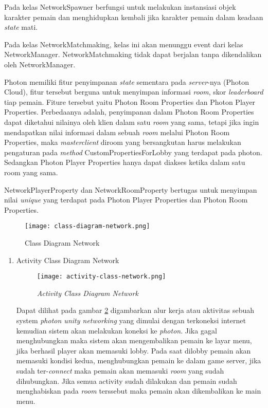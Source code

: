 Pada kelas NetworkSpawner berfungsi untuk melakukan instansiasi objek karakter pemain dan menghidupkan kembali jika karakter pemain dalam keadaan \textit{state} mati.

Pada kelas NetworkMatchmaking, kelas ini akan menunggu event dari kelas NetworkManager. NetworkMatchmaking tidak dapat berjalan tanpa dikendalikan oleh NetworkManager.

Photon memiliki fitur penyimpanan \textit{state} sementara pada \textit{server}-nya (Photon Cloud), fitur tersebut berguna untuk menyimpan informasi \textit{room}, skor \textit{leaderboard} tiap pemain.
Fiture tersebut yaitu Photon Room Properties dan Photon Player Properties.
Perbedaanya adalah, penyimpanan dalam Photon Room Properties dapat diketahui nilainya oleh klien dalam satu \textit{room} yang sama, tetapi jika ingin mendapatkan nilai informasi dalam sebuah \textit{room} melalui Photon Room Properties, maka \textit{masterclient} diroom yang bersangkutan harus melakukan pengaturan pada \textit{method} CustomPropertiesForLobby yang terdapat pada photon.
Sedangkan Photon Player Properties hanya dapat diakses ketika dalam satu room yang sama.

NetworkPlayerProperty dan NetworkRoomProperty bertugas untuk menyimpan nilai \textit{unique} yang terdapat pada Photon Player Properties dan Photon Room Properties.

\begin{figure}[h]
    \centering
    \texttt{[image: class-diagram-network.png]}
    \caption{Class Diagram Network}
    \label{fig:class-network}
\end{figure}

\begin{enumerate}
    \item Activity Class Diagram Network
    \begin{figure}[h]
        \centering
        \texttt{[image: activity-class-network.png]}
        \caption{\textit{Activity Class Diagram Network}}
        \label{fig:activity-class-network}
    \end{figure}
    \newpage
    Dapat dilihat pada gambar \ref{fig:activity-class-network} digambarkan alur kerja atau aktivitas sebuah system \textit{photon unity networking} yang dimulai dengan terkoneksi internet kemudian sistem akan melakukan koneksi ke \textit{photon}. Jika gagal menghubungkan maka sistem akan mengembalikan pemain ke layar menu, jika berhasil player akan memasuki lobby.
    Pada saat dilobby pemain akan memasuki kondisi kedua, menghubungkan pemain ke dalam game server, jika sudah ter-\textit{connect} maka pemain akan memasuki \textit{room} yang sudah dihubungkan. Jika semua activity sudah dilakukan dan pemain sudah menghabiskan pada \textit{room} terssebut maka pemain akan dikembalikan ke main menu.
\end{enumerate}

